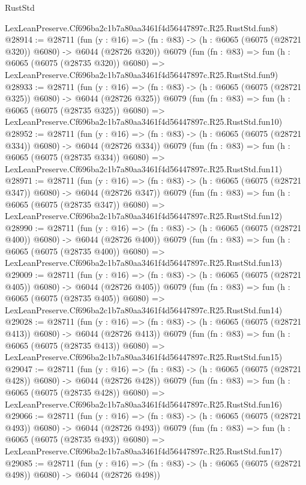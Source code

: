 \begin{lexlean}{RustStd}
\begin{coremodule}
    LexLeanPreserve.Cf696ba2c1b7a80aa3461f4d56447897c.R25.RustStd.fun8)
@28914 := @28711
    (fun (y : @16) => (fn : @83) -> (h : @6065 (@6075 (@28721 @320)) @6080) -> @6044 (@28726 @320))
    @6079
    (fun (fn : @83) =>
    fun (h : @6065 (@6075 (@28735 @320)) @6080) =>
    LexLeanPreserve.Cf696ba2c1b7a80aa3461f4d56447897c.R25.RustStd.fun9)
@28933 := @28711
    (fun (y : @16) => (fn : @83) -> (h : @6065 (@6075 (@28721 @325)) @6080) -> @6044 (@28726 @325))
    @6079
    (fun (fn : @83) =>
    fun (h : @6065 (@6075 (@28735 @325)) @6080) =>
    LexLeanPreserve.Cf696ba2c1b7a80aa3461f4d56447897c.R25.RustStd.fun10)
@28952 := @28711
    (fun (y : @16) => (fn : @83) -> (h : @6065 (@6075 (@28721 @334)) @6080) -> @6044 (@28726 @334))
    @6079
    (fun (fn : @83) =>
    fun (h : @6065 (@6075 (@28735 @334)) @6080) =>
    LexLeanPreserve.Cf696ba2c1b7a80aa3461f4d56447897c.R25.RustStd.fun11)
@28971 := @28711
    (fun (y : @16) => (fn : @83) -> (h : @6065 (@6075 (@28721 @347)) @6080) -> @6044 (@28726 @347))
    @6079
    (fun (fn : @83) =>
    fun (h : @6065 (@6075 (@28735 @347)) @6080) =>
    LexLeanPreserve.Cf696ba2c1b7a80aa3461f4d56447897c.R25.RustStd.fun12)
@28990 := @28711
    (fun (y : @16) => (fn : @83) -> (h : @6065 (@6075 (@28721 @400)) @6080) -> @6044 (@28726 @400))
    @6079
    (fun (fn : @83) =>
    fun (h : @6065 (@6075 (@28735 @400)) @6080) =>
    LexLeanPreserve.Cf696ba2c1b7a80aa3461f4d56447897c.R25.RustStd.fun13)
@29009 := @28711
    (fun (y : @16) => (fn : @83) -> (h : @6065 (@6075 (@28721 @405)) @6080) -> @6044 (@28726 @405))
    @6079
    (fun (fn : @83) =>
    fun (h : @6065 (@6075 (@28735 @405)) @6080) =>
    LexLeanPreserve.Cf696ba2c1b7a80aa3461f4d56447897c.R25.RustStd.fun14)
@29028 := @28711
    (fun (y : @16) => (fn : @83) -> (h : @6065 (@6075 (@28721 @413)) @6080) -> @6044 (@28726 @413))
    @6079
    (fun (fn : @83) =>
    fun (h : @6065 (@6075 (@28735 @413)) @6080) =>
    LexLeanPreserve.Cf696ba2c1b7a80aa3461f4d56447897c.R25.RustStd.fun15)
@29047 := @28711
    (fun (y : @16) => (fn : @83) -> (h : @6065 (@6075 (@28721 @428)) @6080) -> @6044 (@28726 @428))
    @6079
    (fun (fn : @83) =>
    fun (h : @6065 (@6075 (@28735 @428)) @6080) =>
    LexLeanPreserve.Cf696ba2c1b7a80aa3461f4d56447897c.R25.RustStd.fun16)
@29066 := @28711
    (fun (y : @16) => (fn : @83) -> (h : @6065 (@6075 (@28721 @493)) @6080) -> @6044 (@28726 @493))
    @6079
    (fun (fn : @83) =>
    fun (h : @6065 (@6075 (@28735 @493)) @6080) =>
    LexLeanPreserve.Cf696ba2c1b7a80aa3461f4d56447897c.R25.RustStd.fun17)
@29085 := @28711
    (fun (y : @16) => (fn : @83) -> (h : @6065 (@6075 (@28721 @498)) @6080) -> @6044 (@28726 @498))

\end{coremodule}
\end{lexlean}
